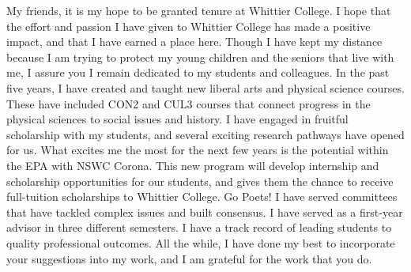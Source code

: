 \documentclass[../../main.tex]{subfiles}
\begin{document}
My friends, it is my hope to be granted tenure at Whittier College.  I hope that the effort and passion I have given to Whittier College has made a positive impact, and that I have earned a place here.  Though I have kept my distance because I am trying to protect my young children and the seniors that live with me, I assure you I remain dedicated to my students and colleagues.  In the past five years, I have created and taught new liberal arts and physical science courses.  These have included CON2 and CUL3 courses that connect progress in the physical sciences to social issues and history.  I have engaged in fruitful scholarship with my students, and several exciting research pathways have opened for us.  What excites me the most for the next few years is the potential within the EPA with NSWC Corona.  This new program will develop internship and scholarship opportunities for our students, and gives them the chance to receive full-tuition scholarships to Whittier College.  Go Poets!  I have served committees that have tackled complex issues and built consensus.  I have served as a first-year advisor in three different semesters.  I have a track record of leading students to quality professional outcomes.  All the while, I have done my best to incorporate your suggestions into my work, and I am grateful for the work that you do.
\end{document}
